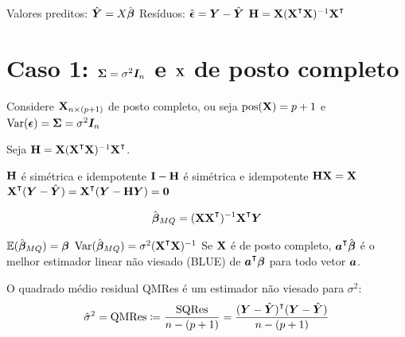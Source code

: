 \begin{definition}
	\leavevmode
	\begin{outline}[enumerate]
		\1 Valores preditos: \( \hat{\bm{Y}} = X\hat{\bm{\beta}} \)
		\1 Resíduos: $\hat{\bm{\epsilon}} = \bm{Y} - \hat{\bm{Y}}$
		\1 \( \m{H} = \m{X}(\m{X}\T\m{X})\inv \m{X}\T \)
	\end{outline}
\end{definition}

\section{Caso 1: \texorpdfstring{$\mathbf{\Sigma} = \sigma^2 \bm{I}_n$}{Sigma = sigma^2 I_n} e $\mathbf{X}$ de posto completo}

Considere $\mathbf{X}_{n \times (p+1)}$ de posto completo, ou seja $\operatorname{pos}(\mathbf{X})=p+1$ e $\operatorname{Var}(\bm{\epsilon})=\mathbf{\Sigma}=\sigma^2\bm{I}_n$

\begin{theorem} Seja $\m{H} = \m{X}(\m{X}\T\m{X})\inv \m{X}\T$.
	\leavevmode
	\begin{outline}[enumerate]
		\1 $\mathbf{H}$ é simétrica e idempotente
		\1 $\mathbf{I}-\mathbf{H}$ é simétrica e idempotente
		\1 $\mathbf{H}\mathbf{X}=\mathbf{X}$
		\1 $\m{X}\T(\v{Y}-\hat{\v{Y}}) = \m{X}\T(\v{Y}-\m{H}\v{Y}) = \v{0}$
	\end{outline}
\end{theorem}

\begin{theorem}
	\begin{equation}
		\hat{\v{\beta}}_{MQ} = (\m{X}\m{X}\T)\inv\m{X}\T \v{Y}
	\end{equation}
\end{theorem}

\begin{theorem}
	\leavevmode
	\begin{outline}[enumerate]
		\1 \( \operatorname{\mathbb{E}}(\hat{\bm{\beta}}_{MQ}) = \bm{\beta} \)
		\1 \( \Var(\hat{\v{\beta}}_{MQ}) = \sigma^2(\m{X}\T\m{X})\inv \)
		\1 Se $\mathbf{X}$ é de posto completo, $\v{a}\T\hat{\v\beta}$ é o melhor estimador linear não viesado (BLUE) de $\v{a}\T\v{\beta}$ para todo vetor $\bm{a}$.
	\end{outline}
\end{theorem}

\begin{theorem}
	O quadrado médio residual QMRes é um estimador não viesado para $\sigma^2$:
	\begin{equation}
		\hat{\sigma}^2 = \qmres \coloneq \frac{\sqres}{n-(p+1)} = \frac{{(\v{Y}-\hat{\v{Y}})\T(\v{Y}-\hat{\v{Y}})}}{n-(p+1)}
	\end{equation}
\end{theorem}

